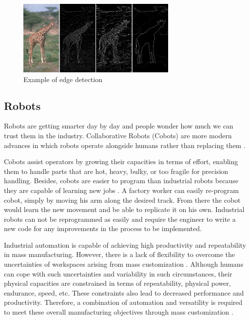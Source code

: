 \begin{figure}[ht]
  \centering
  \includegraphics[width=0.7\textwidth]{graphics/canny.png}
  \caption{Example of edge detection \cite{nalwa_edge_1993}}
  \label{fig:edgedetection}
\end{figure}
\clearpage


\subsection{Robots}
Robots are getting smarter day by day and people wonder how much we can trust them in the industry. Collaborative Robots (Cobots) are more modern advances in which robots operate alongside humans rather than replacing them \cite{pickett_dont_2018}. 

Cobots assist operators by growing their capacities in terms of effort, enabling them to handle parts that are hot, heavy, bulky, or too fragile for precision handling. Besides, cobots are easier to program than industrial robots because they are capable of learning new jobs \cite{schmidbauer_teaching_2020}. A factory worker can easily re-program cobot, simply by moving his arm along the desired track. From there the cobot would learn the new movement and be able to replicate it on his own. Industrial robots can not be reprogrammed as easily and require the engineer to write a new code for any improvements in the process to be implemented.

Industrial automation is capable of achieving high productivity and repeatability in mass manufacturing. However, there is a lack of flexibility to overcome the uncertainties of workspaces arising from mass customization \cite{accorsi_application_2019}. Although humans can cope with such uncertainties and variability in such circumstances, their physical capacities are constrained in terms of repeatability, physical power, endurance, speed, etc. These constraints also lead to decreased performance and productivity. Therefore, a combination of automation and versatility is required to meet these overall manufacturing objectives through mass customization \cite{zaatari_cobot_2019}.  

